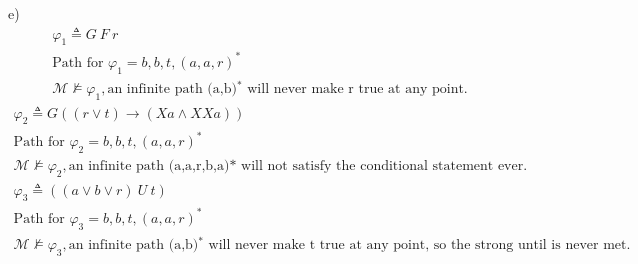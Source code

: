 \documentclass{article}
\begin{document}
e)\\
\begin{align*}
	\varphi_1 \triangleq G\ F\ r\\
	\text{Path for }\varphi_1 = b, b, t, (a,a,r)^*\\
	\mathcal{M} \nvDash \varphi_1, \text{an infinite path (a,b)$^*$ will never make r true at any point.}
\end{align*}
\begin{align*}
	\varphi_2 \triangleq G ((r \lor t) \to (Xa \land XX a))\\
	\text{Path for }\varphi_2 = b, b, t, (a,a,r)^*\\
	\mathcal{M} \nvDash \varphi_2, \text{an infinite path (a,a,r,b,a)* will not satisfy the conditional statement ever.}
\end{align*}
\begin{align*}
	\varphi_3 \triangleq ((a \lor b \lor r)\ U\ t)\\
	\text{Path for } \varphi_3 = b,b,t, (a,a,r)^*\\
	\mathcal{M} \nvDash \varphi_3, \text{an infinite path (a,b)$^*$ will never make t true at any point, so the strong until is never met.}
\end{align*}
\end{document}
